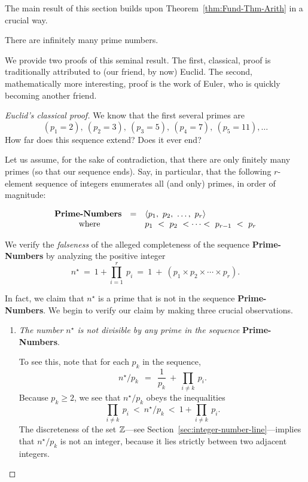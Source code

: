 The main result of this section builds upon Theorem~\ref{thm:Fund-Thm-Arith} in a crucial way.

\begin{prop}
\label{thm:infinite-primes}
There are infinitely many prime numbers.
\end{prop}

We provide two proofs of this seminal result.  The first, classical, proof is traditionally attributed to (our friend, by now) Euclid.  The second, mathematically more interesting, proof is the work of Euler, who is quickly becoming another friend.

 

\begin{proof} [Euclid's classical proof]
We know that the first several primes are
\[ (p_1 =2), \ (p_2 = 3), \ (p_3 =5), \ (p_4 = 7), \ (p_5 =11), \ldots \] 
How far does this sequence extend?  Does it ever end?

\medskip

Let us assume, for the sake of contradiction, that there are only finitely many primes (so that our sequence ends).  Say, in particular, that the following $r$-element sequence of integers enumerates all (and only) primes, in order of magnitude:

\smallskip

\[ \begin{array}{ccl}
\mbox{\bf Prime-Numbers} & = & 
\langle p_1, \ p_2, \ \ldots, \ p_r \rangle \\
\mbox{ where} &  &
p_1 \ < \ p_2 \ < \cdots < \ p_{r-1} \ < \ p_r
\end{array}
\]

\smallskip

We verify the {\em falseness} of the alleged completeness of the sequence {\bf Prime-Numbers} by analyzing the positive integer
\[
n^\star \ = \ 1 + \prod_{i=1}^r \ p_i \ = \ 1 \ + \ \left(p_1 \times p_2 \times \cdots \times p_r \right).
\]

In fact, we claim that $n^\star$ is a prime that is not in the sequence {\bf Prime-Numbers}.  We begin to verify our claim by making three crucial observations.
\begin{enumerate}
\item
{\em The number $n^\star$ is not divisible by any prime in the sequence} {\bf Prime-Numbers}.

\smallskip

To see this, note that for each $p_k$ in the sequence,
\[ n^\star / p_k \ \ = \ \ \frac{1}{p_k} \ + \ \prod_{i \neq k} \ p_i .  \]
Because $p_k \geq 2$, we see that $n^\star / p_k$ obeys the inequalities
\[  \prod_{i \neq k} \ p_i \ < \ n^\star /p_k \ < \ 1 + \prod_{i \neq k} \ p_i.  \] 
The discreteness of the set $\mathbb{Z}$---see Section~\ref{sec:integer-number-line}---implies that $n^\star / p_k$ is not an integer, because it lies strictly between two adjacent integers.


\end{enumerate}
\end{proof}
